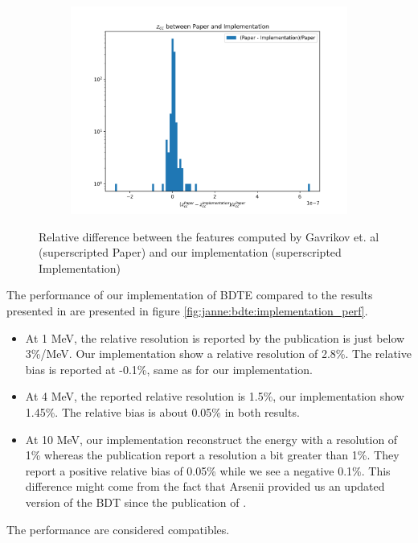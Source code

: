 \documentclass[../main.tex]{subfiles}
\begin{document}
\begin{figure}[ht]
\begin{subfigure}[t]{0.32\linewidth}
    \includegraphics[width=\linewidth]{images/janne/bdte/z_cc_diff.png}
  \end{subfigure}
  \caption{Relative difference between the features computed by Gavrikov et. al (superscripted Paper) and our implementation (superscripted Implementation)}
  \label{fig:janne:feat_diff}
\end{figure}

The performance of our implementation of BDTE compared to the results presented in \cite{gavrikov_energy_2022} are presented in figure \ref{fig:janne:bdte:implementation_perf}.
\begin{itemize}
  \item At 1 MeV, the relative resolution is reported by the publication is just below 3\%/MeV. Our implementation show a relative resolution of 2.8\%. The relative bias is reported at -0.1\%, same as for our implementation.
  \item At 4 MeV, the reported relative resolution is 1.5\%, our implementation show 1.45\%. The relative bias is about 0.05\% in both results.
  \item At 10 MeV, our implementation reconstruct the energy with a resolution of 1\% whereas the publication report a resolution a bit greater than 1\%. They report a positive relative bias of 0.05\% while we see a negative 0.1\%. This difference might come from the fact that Arsenii provided us an updated version of the BDT since the publication of \cite{gavrikov_energy_2022}.
\end{itemize}
The performance are considered compatibles.
\end{document}
